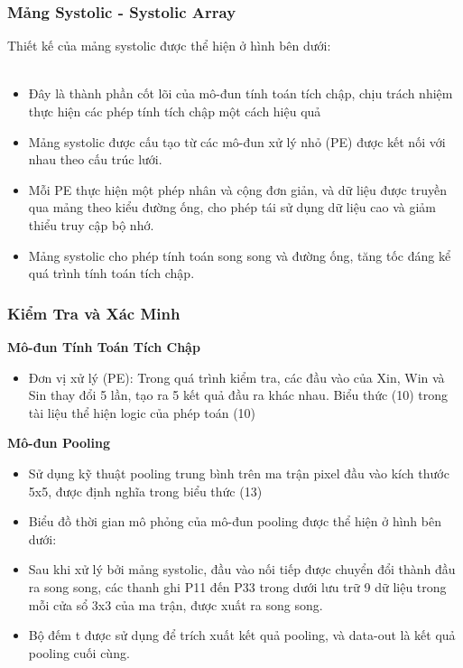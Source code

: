 \subsubsection{Mảng Systolic - Systolic Array}
Thiết kế của mảng systolic được thể hiện ở hình bên dưới:\\
\\
\begin{itemize}
    \item Đây là thành phần cốt lõi của mô-đun tính toán tích chập, chịu trách nhiệm thực hiện các phép tính tích chập một cách hiệu quả
    \item Mảng systolic được cấu tạo từ các mô-đun xử lý nhỏ (PE) được kết nối với nhau theo cấu trúc lưới.
    \item Mỗi PE thực hiện một phép nhân và cộng đơn giản, và dữ liệu được truyền qua mảng theo kiểu đường ống, cho phép tái sử dụng dữ liệu cao và giảm thiểu truy cập bộ nhớ.
    \item Mảng systolic cho phép tính toán song song và đường ống, tăng tốc đáng kể quá trình tính toán tích chập.
\end{itemize}
\subsubsection{Kiểm Tra và Xác Minh}
\textbf{Mô-đun Tính Toán Tích Chập}
\begin{itemize}
    \item Đơn vị xử lý (PE): Trong quá trình kiểm tra, các đầu vào của Xin, Win và Sin thay đổi 5 lần, tạo ra 5 kết quả đầu ra khác nhau. Biểu thức (10) trong tài liệu thể hiện logic của phép toán (10)
    
\end{itemize}
\textbf{Mô-đun Pooling}
\begin{itemize}
    \item Sử dụng kỹ thuật pooling trung bình trên ma trận pixel đầu vào kích thước 5x5, được định nghĩa trong biểu thức (13)
    \item Biểu đồ thời gian mô phỏng của mô-đun pooling được thể hiện ở hình bên dưới:
    \item Sau khi xử lý bởi mảng systolic, đầu vào nối tiếp được chuyển đổi thành đầu ra song song, các thanh ghi P11 đến P33 trong dưới lưu trữ 9 dữ liệu trong mỗi cửa sổ 3x3 của ma trận, được xuất ra song song.
    \item Bộ đếm t được sử dụng để trích xuất kết quả pooling, và data-out là kết quả pooling cuối cùng.
\end{itemize}
